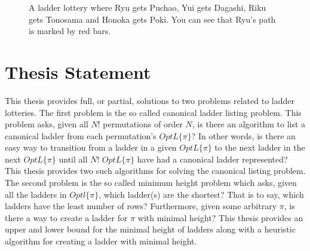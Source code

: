 \begin{center}
\begin{figure}[!htp]
\caption{A ladder lottery where Ryu gets Puchao, Yui gets Dagashi, Riku gets Tonosama and Honoka gets Poki. You can see that Ryu's path is marked by red bars.}
\label{fig:aa}
\end{figure}
\end{center}


\section{Thesis Statement}
  	This thesis provides full, or partial, solutions to two problems related 
    to ladder lotteries. The first problem is the so called canonical ladder listing problem. 
    This problem asks, given all $N!$ permutations of order $N$, is there an algorithm 
    to list a canonical ladder from each permutation's $OptL\{\pi\}$? In other words, 
	is there an easy way to transition from a ladder in 
	a given $OptL\{\pi\}$ to the next ladder in the next $OptL\{\pi\}$ until all $N!$ $OptL\{\pi\}$ have had a canonical 
	ladder represented?  This thesis provides two such algorithms for solving the canonical 
	listing problem. The second problem is the so called minimum height 
    problem which asks, given all the ladders in $Optl\{\pi\}$, which ladder(s) are 
    the shortest? That is to say, which ladders have the least number of rows? Furthermore, given some arbitrary $\pi$, 
    is there a way to create a ladder for $\pi$ with minimal height? This thesis 
    provides an upper and lower bound for the minimal height of ladders along with a heuristic algorithm 
	for creating a ladder with minimal height.
	
